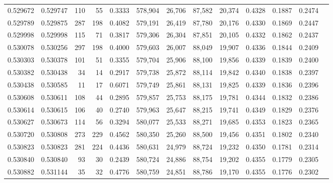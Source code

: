 \begin{tabular}{rrrrrrrrrrrrr}
0.529672 & 0.529747 &   110 &    55 &                                     0.3333 & 578,904 &  26,706 &  87,582 &  20,374 & 0.4328 & 0.1887 & 0.2474 \\
0.529789 & 0.529875 &   287 &   198 &                                     0.4082 & 579,191 &  26,419 &  87,780 &  20,176 & 0.4330 & 0.1869 & 0.2447 \\
0.529998 & 0.529998 &   115 &    71 &                                     0.3817 & 579,306 &  26,304 &  87,851 &  20,105 & 0.4332 & 0.1862 & 0.2437 \\
0.530078 & 0.530256 &   297 &   198 &                                     0.4000 & 579,603 &  26,007 &  88,049 &  19,907 & 0.4336 & 0.1844 & 0.2409 \\
0.530303 & 0.530378 &   101 &    51 &                                     0.3355 & 579,704 &  25,906 &  88,100 &  19,856 & 0.4339 & 0.1839 & 0.2400 \\
0.530382 & 0.530438 &    34 &    14 &                                     0.2917 & 579,738 &  25,872 &  88,114 &  19,842 & 0.4340 & 0.1838 & 0.2397 \\
0.530438 & 0.530585 &    11 &    17 &                                     0.6071 & 579,749 &  25,861 &  88,131 &  19,825 & 0.4339 & 0.1836 & 0.2396 \\
0.530608 & 0.530611 &   108 &    44 &                                     0.2895 & 579,857 &  25,753 &  88,175 &  19,781 & 0.4344 & 0.1832 & 0.2386 \\
0.530614 & 0.530615 &   106 &    40 &                                     0.2740 & 579,963 &  25,647 &  88,215 &  19,741 & 0.4349 & 0.1829 & 0.2376 \\
0.530627 & 0.530673 &   114 &    56 &                                     0.3294 & 580,077 &  25,533 &  88,271 &  19,685 & 0.4353 & 0.1823 & 0.2365 \\
0.530720 & 0.530808 &   273 &   229 &                                     0.4562 & 580,350 &  25,260 &  88,500 &  19,456 & 0.4351 & 0.1802 & 0.2340 \\
0.530823 & 0.530823 &   281 &   224 &                                     0.4436 & 580,631 &  24,979 &  88,724 &  19,232 & 0.4350 & 0.1781 & 0.2314 \\
0.530840 & 0.530840 &    93 &    30 &                                     0.2439 & 580,724 &  24,886 &  88,754 &  19,202 & 0.4355 & 0.1779 & 0.2305 \\
0.530882 & 0.531144 &    35 &    32 &                                     0.4776 & 580,759 &  24,851 &  88,786 &  19,170 & 0.4355 & 0.1776 & 0.2302 \\

\end{tabular}
